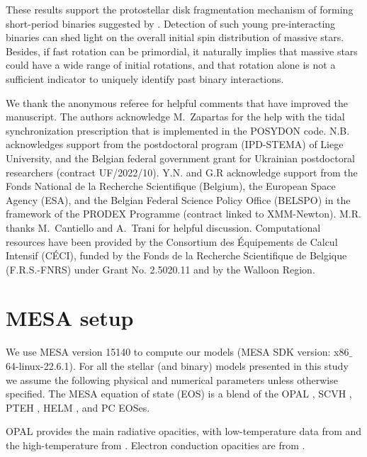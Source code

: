 \documentclass{aa}
\begin{document}
These results support the protostellar disk fragmentation mechanism of forming short-period binaries suggested by \citet{Tokovinin_2020}.
Detection of such young pre-interacting binaries can shed light on the overall initial spin distribution of massive stars.
Besides, if fast rotation can be primordial, it naturally implies that massive
stars could have a wide range of initial rotations, and that rotation
alone is not a sufficient indicator to uniquely identify past binary interactions.

\begin{acknowledgements}
We thank the anonymous referee for helpful comments that
have improved the manuscript. The authors acknowledge M.~Zapartas for the help with the tidal synchronization prescription that is implemented in the POSYDON code.
N.B. acknowledges support from the postdoctoral program (IPD-STEMA) of
Liege University, and the Belgian federal government grant for Ukrainian
postdoctoral researchers (contract UF/2022/10). Y.N. and G.R acknowledge support from the Fonds
National de la Recherche Scientifique (Belgium), the European Space
Agency (ESA), and the Belgian Federal Science Policy Office (BELSPO)
in the framework of the PRODEX Programme (contract linked to
XMM-Newton). M.R. thanks M.~Cantiello and A.~Trani for helpful discussion.
Computational resources have been provided by the Consortium des Équipements de Calcul Intensif (CÉCI), funded by the Fonds de la Recherche Scientifique de Belgique (F.R.S.-FNRS) under Grant No. 2.5020.11 and by the Walloon Region.
\end{acknowledgements}

\appendix


\section{MESA setup}
\label{sec:MESA_setup}


We use MESA version 15140 to compute our models (MESA SDK version: x86$\_$64-linux-22.6.1). For all the stellar (and binary) models presented in
this study we assume the following physical and numerical parameters
unless otherwise specified. The MESA equation of
state (EOS) is a blend of the OPAL \citet{Rogers2002}, SCVH
\citet{Saumon1995}, PTEH \citet{Pols1995}, HELM \citet{Timmes2000},
and PC \citet{Potekhin2010} EOSes.

OPAL \citep{Iglesias1993, Iglesias1996} provides the main radiative
opacities, with low-temperature data from \citet{Ferguson2005} and the
high-temperature from \citet{Buchler1976}. Electron conduction
opacities are from \citet{Cassisi2007}.
\end{document}
